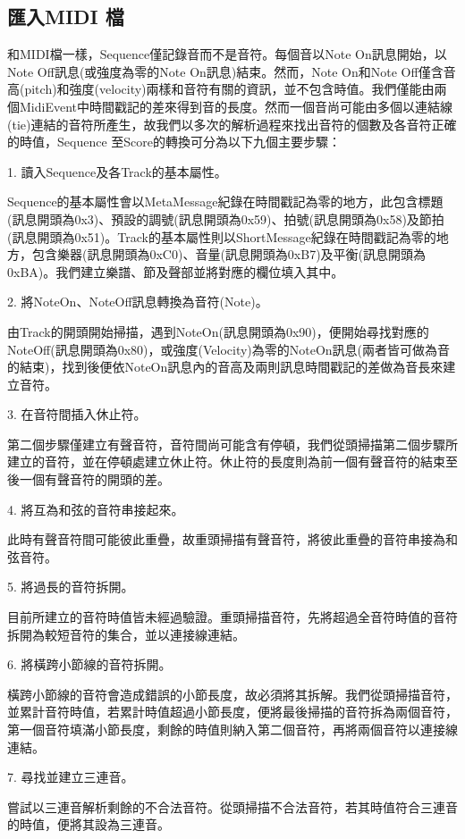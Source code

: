 \documentclass[12pt,a4paper,oneside]{report}
\begin{document}
\subsection{匯入MIDI 檔}

和MIDI檔一樣，Sequence僅記錄音而不是音符。每個音以Note On訊息開始，以Note Off訊息(或強度為零的Note On訊息)結束。然而，Note On和Note Off僅含音高(pitch)和強度(velocity)兩樣和音符有關的資訊，並不包含時值。我們僅能由兩個MidiEvent中時間戳記的差來得到音的長度。然而一個音尚可能由多個以連結線(tie)連結的音符所產生，故我們以多次的解析過程來找出音符的個數及各音符正確的時值，Sequence 至Score的轉換可分為以下九個主要步驟： 

1. 讀入Sequence及各Track的基本屬性。 

Sequence的基本屬性會以MetaMessage紀錄在時間戳記為零的地方，此包含標題(訊息開頭為0x3)、預設的調號(訊息開頭為0x59)、拍號(訊息開頭為0x58)及節拍(訊息開頭為0x51)。Track的基本屬性則以ShortMessage紀錄在時間戳記為零的地方，包含樂器(訊息開頭為0xC0)、音量(訊息開頭為0xB7)及平衡(訊息開頭為0xBA)。我們建立樂譜、節及聲部並將對應的欄位填入其中。

2. 將NoteOn、NoteOff訊息轉換為音符(Note)。 

由Track的開頭開始掃描，遇到NoteOn(訊息開頭為0x90)，便開始尋找對應的NoteOff(訊息開頭為0x80)，或強度(Velocity)為零的NoteOn訊息(兩者皆可做為音的結束)，找到後便依NoteOn訊息內的音高及兩則訊息時間戳記的差做為音長來建立音符。

3. 在音符間插入休止符。 

第二個步驟僅建立有聲音符，音符間尚可能含有停頓，我們從頭掃描第二個步驟所建立的音符，並在停頓處建立休止符。休止符的長度則為前一個有聲音符的結束至後一個有聲音符的開頭的差。

4. 將互為和弦的音符串接起來。 

此時有聲音符間可能彼此重疊，故重頭掃描有聲音符，將彼此重疊的音符串接為和弦音符。

5. 將過長的音符拆開。 

目前所建立的音符時值皆未經過驗證。重頭掃描音符，先將超過全音符時值的音符拆開為較短音符的集合，並以連接線連結。

6. 將橫跨小節線的音符拆開。

橫跨小節線的音符會造成錯誤的小節長度，故必須將其拆解。我們從頭掃描音符，並累計音符時值，若累計時值超過小節長度，便將最後掃描的音符拆為兩個音符，第一個音符填滿小節長度，剩餘的時值則納入第二個音符，再將兩個音符以連接線連結。

7. 尋找並建立三連音。 

嘗試以三連音解析剩餘的不合法音符。從頭掃描不合法音符，若其時值符合三連音的時值，便將其設為三連音。
\end{document}
